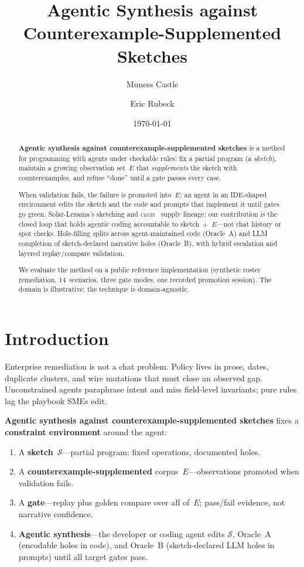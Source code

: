 \documentclass[11pt]{article}
\title{Agentic Synthesis against Counterexample-Supplemented Sketches}
\author{Muness Castle \and Eric Rubeck}
\date{\today}
\begin{document}
\maketitle

\begin{abstract}
\textbf{Agentic synthesis against counterexample-supplemented sketches} is a method
for programming with agents under checkable rules: fix a partial program (a \emph{sketch}),
maintain a growing observation set~$E$ that \emph{supplements} the sketch with
counterexamples, and refuse ``done'' until a gate passes every case.

When validation fails, the failure is promoted into~$E$; an agent in an IDE-shaped
environment edits the sketch and the code and prompts that implement it until gates go
green. Solar-Lezama's sketching and \textsc{cegis}~\cite{solar2013sketching,solar2008sketching}
supply lineage; our contribution is the closed loop that holds agentic coding accountable
to sketch~$+$~$E$---not chat history or spot checks. Hole-filling splits across
agent-maintained code (Oracle~A) and LLM completion of sketch-declared narrative holes
(Oracle~B), with hybrid escalation and layered replay/compare validation.

We evaluate the method on a public reference implementation (synthetic roster remediation,
14~scenarios, three gate modes, one recorded promotion session). The domain is illustrative;
the technique is domain-agnostic.
\end{abstract}

\section{Introduction}
\label{sec:intro}

Enterprise remediation is not a chat problem. Policy lives in prose, dates, duplicate
clusters, and wire mutations that must close an observed gap. Unconstrained agents
paraphrase intent and miss field-level invariants; pure rules lag the playbook SMEs edit.

\textbf{Agentic synthesis against counterexample-supplemented sketches} fixes a
\textbf{constraint environment} around the agent:

\begin{enumerate}
\item A \textbf{sketch}~$\mathcal{S}$---partial program: fixed operations, documented holes.
\item A \textbf{counterexample-supplemented} corpus~$E$---observations promoted when
      validation fails.
\item A \textbf{gate}---replay plus golden compare over all of~$E$; pass/fail evidence,
      not narrative confidence.
\item \textbf{Agentic synthesis}---the developer or coding agent edits $\mathcal{S}$,
      Oracle~A (encodable holes in code), and Oracle~B (sketch-declared LLM holes in
      prompts) until all target gates pass.
\end{enumerate}
\end{document}
